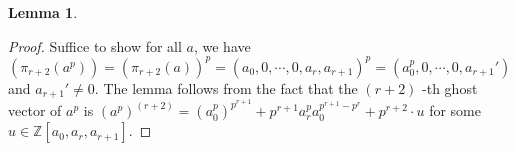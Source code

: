 \documentclass{proc-l}
\newtheorem{lemma}[theorem]{Lemma}
\theoremstyle{definition}
\theoremstyle{remark}
\newtheorem{remark}[theorem]{Remark}
\numberwithin{equation}{section}
\begin{document}
{\begin{lemma}
\end{lemma}
\begin{proof}
Suffice to show for all $a$, we have $(\pi_{r+2}(a^p))=(\pi_{r+2}(a))^p=(a_0,0,\cdots,0,a_r,a_{r+1})^p=(a_0^p,0,\cdots,0,a_{r+1}')$ and $a_{r+1}'\neq0$. The lemma follows from the fact that the $(r+2)$ -th ghost vector of $a^p$ is $(a^p)^{(r+2)}=(a_0^p)^{p^{r+1}}+p^{r+1}a_r^pa_0^{p^{r+1}-p^r}+p^{r+2}\cdot u$ for some $u\in\mathbb Z[a_0,a_r,a_{r+1}]$.

\end{proof}

}
\end{document}
